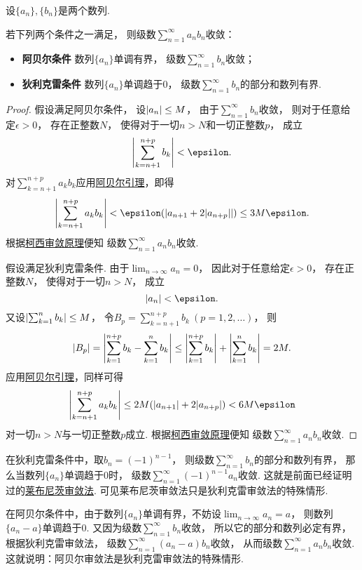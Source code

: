 \begin{theorem}\label{theorem:无穷级数.无穷级数的阿贝尔--狄利克雷审敛法}
设\(\{a_n\},\{b_n\}\)是两个数列.

若下列两个条件之一满足，
则级数\(\sum_{n=1}^\infty a_n b_n\)收敛：\begin{itemize}
	\item {\bf 阿贝尔条件}
	数列\(\{a_n\}\)单调有界，
	级数\(\sum_{n=1}^\infty b_n\)收敛；

	\item {\bf 狄利克雷条件}
	数列\(\{a_n\}\)单调趋于\(0\)，
	级数\(\sum_{n=1}^\infty b_n\)的部分和数列有界.
\end{itemize}
\begin{proof}
假设满足阿贝尔条件，
设\(\abs{a_n} \leq M\)，
由于\(\sum_{n=1}^\infty b_n\)收敛，
则对于任意给定\(\epsilon>0\)，
存在正整数\(N\)，
使得对于一切\(n>N\)和一切正整数\(p\)，
成立\[
	\abs{\sum_{k=n+1}^{n+p} b_k} < \epsilon.
\]
对\(\sum_{k=n+1}^{n+p} a_k b_k\)应用\hyperref[theorem:无穷级数.阿贝尔引理]{阿贝尔引理}，即得\[
	\abs{\sum_{k=n+1}^{n+p} a_k b_k}
	< \epsilon (\abs{a_{n+1} + 2 \abs{a_{n+p}}})
	\leq 3 M \epsilon.
\]
根据\hyperref[theorem:无穷级数.级数的柯西审敛原理]{柯西审敛原理}便知
级数\(\sum_{n=1}^\infty a_n b_n\)收敛.

假设满足狄利克雷条件.
由于\(\lim_{n\to\infty} a_n = 0\)，
因此对于任意给定\(\epsilon>0\)，
存在正整数\(N\)，
使得对于一切\(n>N\)，
成立\[
	\abs{a_n} < \epsilon.
\]
又设\(\abs{\sum_{k=1}^n b_k} \leq M\)，
令\(B_p = \sum_{k=n+1}^{n+p} b_k\ (p=1,2,\dotsc)\)，
则\[
	\abs{B_p}
	= \abs{\sum_{k=1}^{n+p} b_k - \sum_{k=1}^n b_k}
	\leq \abs{\sum_{k=1}^{n+p} b_k} + \abs{\sum_{k=1}^n b_k}
	= 2 M.
\]
应用\hyperref[theorem:无穷级数.阿贝尔引理]{阿贝尔引理}，同样可得\[
	\abs{\sum_{k=n+1}^{n+p} a_k b_k}
	\leq 2 M (\abs{a_{n+1}} + 2 \abs{a_{n+p}})
	< 6 M \epsilon
\]对一切\(n>N\)与一切正整数\(p\)成立.
根据\hyperref[theorem:无穷级数.级数的柯西审敛原理]{柯西审敛原理}便知
级数\(\sum_{n=1}^\infty a_n b_n\)收敛.
\end{proof}
\end{theorem}
\begin{remark}
在狄利克雷条件中，取\(b_n = (-1)^{n-1}\)，
则级数\(\sum_{n=1}^\infty b_n\)的部分和数列有界，
那么当数列\(\{a_n\}\)单调趋于\(0\)时，
级数\(\sum_{n=1}^\infty (-1)^{n-1} a_n\)收敛.
这就是前面已经证明过的\hyperref[theorem:无穷级数.莱布尼茨定理]{莱布尼茨审敛法}.
可见莱布尼茨审敛法只是狄利克雷审敛法的特殊情形.

在阿贝尔条件中，由于数列\(\{a_n\}\)单调有界，不妨设\(\lim_{n\to\infty} a_n = a\)，
则数列\(\{a_n - a\}\)单调趋于\(0\).
又因为级数\(\sum_{n=1}^\infty b_n\)收敛，
所以它的部分和数列必定有界，根据狄利克雷审敛法，
级数\(\sum_{n=1}^\infty (a_n - a) b_n\)收敛，
从而级数\(\sum_{n=1}^\infty a_n b_n\)收敛.
这就说明：阿贝尔审敛法是狄利克雷审敛法的特殊情形.
\end{remark}

